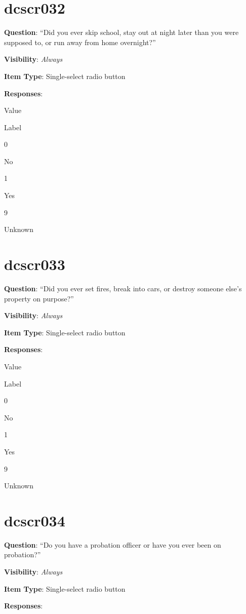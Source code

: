\documentclass[]{book}
\begin{document}
\hypertarget{dcscr032}{%
\section{dcscr032}\label{dcscr032}}

\textbf{Question}: ``Did you ever skip school, stay out at night later than you were supposed to, or run away from home overnight?''

\textbf{Visibility}: \emph{Always}

\textbf{Item Type}: Single-select radio button

\textbf{Responses}:

Value

Label

0

No

1

Yes

9

Unknown

\hypertarget{dcscr033}{%
\section{dcscr033}\label{dcscr033}}

\textbf{Question}: ``Did you ever set fires, break into cars, or destroy someone else's property on purpose?''

\textbf{Visibility}: \emph{Always}

\textbf{Item Type}: Single-select radio button

\textbf{Responses}:

Value

Label

0

No

1

Yes

9

Unknown

\hypertarget{dcscr034}{%
\section{dcscr034}\label{dcscr034}}

\textbf{Question}: ``Do you have a probation officer or have you ever been on probation?''

\textbf{Visibility}: \emph{Always}

\textbf{Item Type}: Single-select radio button

\textbf{Responses}:
\end{document}
